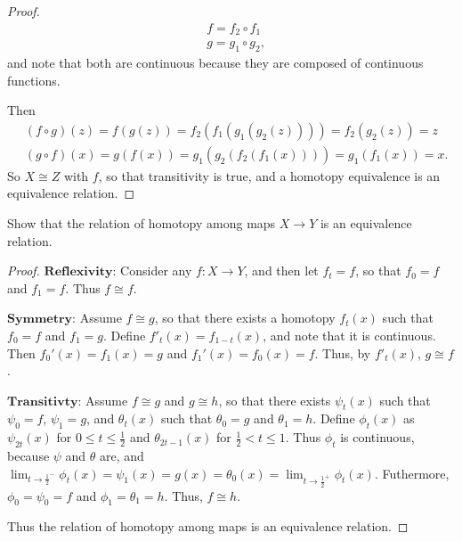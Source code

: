 \documentclass[12pt]{article}
\newenvironment{statement}[2][Statement]{\begin{trivlist}
\item[\hskip \labelsep {\bfseries #1}\hskip \labelsep {\bfseries #2.}]}{\end{trivlist}}
\begin{document}
\begin{proof}
    \begin{align*}
        & f = f_2 \circ f_1 \\
        &  g = g_1 \circ g_2,
    \end{align*}
    and note that both are continuous because they are composed of continuous functions. 
    \par Then 
    \begin{align*}
        & (f \circ g)(z) = f(g(z))=f_2(f_1(g_1(g_2(z))))=f_2(g_2(z))=z \\
        & (g \circ f)(x) = g(f(x))=g_1(g_2(f_2(f_1(x))))=g_1(f_1(x))=x.
    \end{align*}
    So $X \cong Z$ with $f$, so that transitivity is true, and a homotopy equivalence is an equivalence relation.
\end{proof}

\begin{statement}[Exercise]{0.3b}
    Show that the relation of homotopy among maps $X \to Y$ is an equivalence relation. 
\end{statement}
\begin{proof}
    \par $\mathbf{Reflexivity}$: Consider any $f: X \to Y$, and then let $f_t=f$, so that $f_0=f$ and $f_1=f$. Thus $f \cong f$.
    \par $\mathbf{Symmetry}$: Assume $f \cong g$, so that there exists a homotopy $f_t(x)$ such that $f_0=f$ and $f_1=g$. Define $f'_t(x)=f_{1-t}(x)$, and note that it is continuous. Then $f_0'(x)=f_1(x)=g$ and $f_1'(x)=f_0(x)=f$. Thus, by $f'_t(x)$, $g \cong f$.
    \par $\mathbf{Transitivty}$: Assume $f \cong g$ and $g \cong h$, so that there exists $\psi_t(x)$ such that $\psi_0=f$, $\psi_1=g$, and $\theta_t(x)$ such that $\theta_0=g$ and $\theta_1=h$. Define $\phi_t(x)$ as $\psi_{2t}(x)$ for $0 \leq t \leq \frac{1}{2}$ and $\theta_{2t-1}(x)$ for $\frac{1}{2} < t \leq 1$. Thus $\phi_t$ is continuous, because $\psi$ and $\theta$ are, and $\lim_{t \to \frac{1}{2}^-} \phi_t(x)=\psi_1(x)=g(x)=\theta_0(x)=\lim_{t \to \frac{1}{2}^+} \phi_t(x)$. Futhermore, $\phi_0= \psi_0=f$ and $\phi_1= \theta_1 = h$. Thus, $f \cong h$.
    \par Thus the relation of homotopy among maps is an equivalence relation.
\end{proof}
\end{document}
